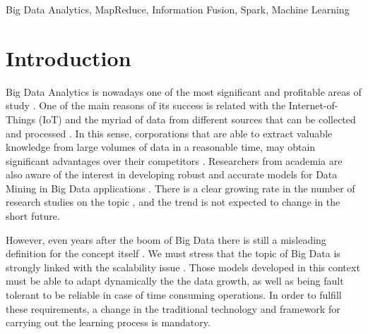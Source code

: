 \documentclass[3p,review]{elsarticle}
\begin{document}
\begin{frontmatter}
\begin{abstract}

\end{abstract}

\begin{keyword}
Big Data Analytics, MapReduce, Information Fusion, Spark, Machine Learning
\end{keyword}

\end{frontmatter}

\section{Introduction}\label{sec:intro}


Big Data Analytics is nowadays one of the most significant and profitable areas of study \cite{Chen12-BI-BD, Min13-BDAnalBook, Kam14, Fer14}. One of the main reasons of its success is related with the Internet-of-Things (IoT) and the myriad of data from different sources that can be collected and processed \cite{Fuqaha15-IoT, Xu14-IoT}. In this sense, corporations that are able to extract valuable knowledge from large volumes of data in a reasonable time, may obtain significant advantages over their competitors \cite{Lar16-BI,Choi17-BDAnal}. Researchers from academia are also aware of the interest in developing robust and accurate models for Data Mining in Big Data applications \cite{Wu14-DMBD,Wix14-BDAcad}. There is a clear growing rate in the number of research studies on the topic \cite{Abb16-BDIS}, and the trend is not expected to change in the short future.

However, even years after the boom of Big Data there is still a misleading definition for the concept itself \cite{Gan15-BDhype}. We must stress that the topic of Big Data is strongly linked with the scalability issue \cite{Hu14-ScalBDAnal}. Those models developed in this context must be able to adapt dynamically the the data growth, as well as being fault tolerant to be reliable in case of time consuming operations. In order to fulfill these requirements, a change in the traditional technology and framework for carrying out the learning process is mandatory. 
\end{document}
